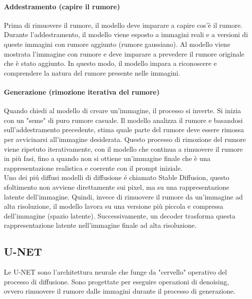 \paragraph{Addestramento (capire il rumore)}
Prima di rimuovere il rumore, il modello deve imparare a capire cos'è il rumore. Durante l'addestramento, il modello viene esposto a immagini reali e a versioni di queste immagini con rumore aggiunto (rumore gaussiano). 
Al modello viene mostrata l'immagine con rumore e deve imparare a prevedere il rumore originale che è stato aggiunto. In questo modo, il modello impara a riconoscere e comprendere la natura del rumore presente nelle immagini.\\

\paragraph{Generazione (rimozione iterativa del rumore)}
Quando chiedi al modello di creare un'immagine, il processo si inverte. Si inizia con un "seme" di puro rumore casuale. Il modello analizza il rumore e basandosi sull'addestramento precedente, stima quale parte del rumore deve essere rimossa per avvicinarsi all'immagine desiderata. Questo processo di rimozione del rumore viene ripetuto iterativamente, con il modello che continua a rimuovere il rumore in più fasi, fino a quando non si ottiene un'immagine finale che è una rappresentazione realistica e coerente con il prompt iniziale.\\

Uno dei piú diffusi modelli di diffusione é chiamato Stable Diffusion, questo sfoltimento non avviene direttamente sui pixel, ma su una rappresentazione latente dell'immagine. Quindi, invece di rimuovere il rumore da un'immagine ad alta risoluzione, il modello lavora su una versione più piccola e compressa dell'immagine (spazio latente). Successivamente, un decoder trasforma questa rappresentazione latente nell'immagine finale ad alta risoluzione.\\

\subsection{U-NET}
Le U-NET sono l'architettura neurale che funge da "cervello" operativo del processo di diffusione. Sono progettate per eseguire operazioni di denoising, ovvero rimuovere il rumore dalle immagini durante il processo di generazione.\\

